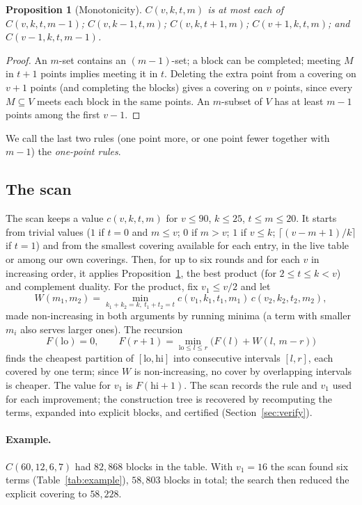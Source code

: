 \documentclass[11pt]{article}
\newtheorem{proposition}[lemma]{Proposition}
\theoremstyle{remark}
\begin{document}
\begin{proposition}[Monotonicity]\label{prop:mono}
$C(v,k,t,m)$ is at most each of $C(v,k,t,m-1)$; $C(v,k-1,t,m)$; $C(v,k,t+1,m)$; $C(v+1,k,t,m)$; and
$C(v-1,k,t,m-1)$.
\end{proposition}
\begin{proof}
An $m$-set contains an $(m-1)$-set; a block can be completed; meeting $M$ in $t+1$ points implies meeting it in $t$.
Deleting the extra point from a covering on $v+1$ points (and completing the blocks) gives a covering on $v$ points,
since every $M\subseteq V$ meets each block in the same points. An $m$-subset of $V$ has at least $m-1$ points among
the first $v-1$.
\end{proof}
We call the last two rules (one point more, or one point fewer together with $m-1$) the \emph{one-point rules}.

\subsection{The scan}

The scan keeps a value $c(v,k,t,m)$ for $v\le 90$, $k\le 25$, $t\le m\le 20$. It starts from trivial values ($1$
if $t=0$ and $m\le v$; $0$ if $m>v$; $1$ if $v\le k$; $\lceil(v-m+1)/k\rceil$ if $t=1$) and from the smallest
covering available for each entry, in the live table or among our own coverings. Then, for up to six rounds and for
each $v$ in increasing order, it applies Proposition~\ref{prop:mono}, the best product (for $2\le t\le k<v$) and
complement duality. For the product, fix $v_1\le v/2$ and let
\[
W(m_1,m_2)=\min_{k_1+k_2=k,\ t_1+t_2=t} c(v_1,k_1,t_1,m_1)\,c(v_2,k_2,t_2,m_2),
\]
made non-increasing in both arguments by running minima (a term with smaller $m_i$ also serves larger ones). The
recursion
\[
F(\mathrm{lo})=0,\qquad F(r+1)=\min_{\mathrm{lo}\le l\le r}\bigl(F(l)+W(l,\,m-r)\bigr)
\]
finds the cheapest partition of $[\mathrm{lo},\mathrm{hi}]$ into consecutive intervals $[l,r]$, each covered by one
term; since $W$ is non-increasing, no cover by overlapping intervals is cheaper. The value for $v_1$ is
$F(\mathrm{hi}+1)$. The scan records the rule and $v_1$ used for each improvement; the construction tree is recovered
by recomputing the terms, expanded into explicit blocks, and certified (Section~\ref{sec:verify}).

\paragraph{Example.} $C(60,12,6,7)$ had $82{,}868$ blocks in the table. With $v_1=16$ the scan found six terms
(Table~\ref{tab:example}), $58{,}803$ blocks in total; the search then reduced the explicit covering to $58{,}228$.
\end{document}
